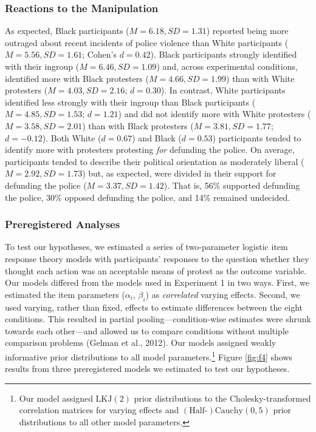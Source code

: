 \documentclass[12pt, letterpaper]{article}
\begin{document}
\hypertarget{reactions-to-the-manipulation-1}{%
\subsubsection{Reactions to the
Manipulation}\label{reactions-to-the-manipulation-1}}

As expected, Black participants (\(M = 6.18, \textit{SD} = 1.31\))
reported being more outraged about recent incidents of police violence
than White participants (\(M = 5.56, \textit{SD} = 1.61\); Cohen's
\(d = 0.42\)). Black participants strongly identified with their ingroup
(\(M = 6.46, \textit{SD} = 1.09\)) and, across experimental conditions,
identified more with Black protesters (\(M = 4.66, \textit{SD} = 1.99\))
than with White protesters (\(M = 4.03, \textit{SD} = 2.16\);
\(d = 0.30\)). In contrast, White participants identified less strongly
with their ingroup than Black participants
(\(M = 4.85, \textit{SD} = 1.53\); \(d = 1.21\)) and did not identify
more with White protesters (\(M = 3.58, \textit{SD} = 2.01\)) than with
Black protesters (\(M = 3.81, \textit{SD} = 1.77\); \(d = -0.12\)). Both
White (\(d = 0.67\)) and Black (\(d = 0.53\)) participants tended to
identify more with protesters protesting \emph{for} defunding the
police. On average, participants tended to describe their political
orientation as moderately liberal (\(M = 2.92, \textit{SD} = 1.73\))
but, as expected, were divided in their support for defunding the police
(\(M = 3.37, \textit{SD} = 1.42\)). That is, 56\% supported defunding
the police, 30\% opposed defunding the police, and 14\% remained
undecided.

\hypertarget{preregistered-analyses-1}{%
\subsubsection{Preregistered Analyses}\label{preregistered-analyses-1}}

To test our hypotheses, we estimated a series of two-parameter logistic
item response theory models with participants' responses to the question
whether they thought each action was an acceptable means of protest as
the outcome variable. Our models differed from the models used in
Experiment 1 in two ways. First, we estimated the item parameters
(\(\alpha_i\), \(\beta_i\)) as \emph{correlated} varying effects.
Second, we used varying, rather than fixed, effects to estimate
differences between the eight conditions. This resulted in partial
pooling---condition-wise estimates were shrunk towards each other---and
allowed us to compare conditions without multiple comparison problems
(Gelman et al., 2012). Our models assigned weakly informative prior
distributions to all model parameters.\footnote{Our model assigned
  \(\text{LKJ} (2)\) prior distributions to the Cholesky-transformed
  correlation matrices for varying effects and
  \((\text{Half-})\text{Cauchy} (0, 5)\) prior distributions to all
  other model parameters.} Figure \ref{fig:f4} shows results from three
preregistered models we estimated to test our hypotheses.
\end{document}
